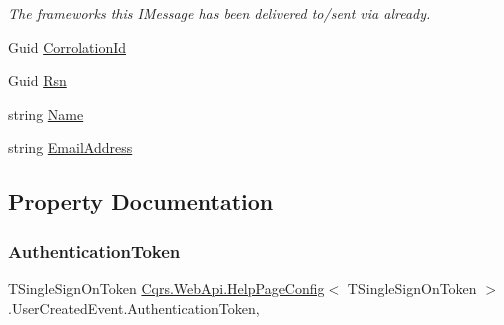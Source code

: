 \begin{DoxyCompactItemize}
\begin{DoxyCompactList}\small\item\em The frameworks this I\+Message has been delivered to/sent via already. \end{DoxyCompactList}\item 
Guid \hyperlink{classCqrs_1_1WebApi_1_1HelpPageConfig_1_1UserCreatedEvent_a180187e5f4bbecad7b713efa3df64287}{Corrolation\+Id}
\item 
Guid \hyperlink{classCqrs_1_1WebApi_1_1HelpPageConfig_1_1UserCreatedEvent_a5921e34dd4ceb0222c5d676d5ec280c4}{Rsn}
\item 
string \hyperlink{classCqrs_1_1WebApi_1_1HelpPageConfig_1_1UserCreatedEvent_a7f2d8b02965bf47c010f7f85ae70df7e}{Name}
\item 
string \hyperlink{classCqrs_1_1WebApi_1_1HelpPageConfig_1_1UserCreatedEvent_a178a10218a8cdcc980ee9d7588970a4a}{Email\+Address}
\end{DoxyCompactItemize}


\subsection{Property Documentation}
\mbox{\label{classCqrs_1_1WebApi_1_1HelpPageConfig_1_1UserCreatedEvent_aa8d10ff30ee35f23533da85c0dac8d88}} 
\subsubsection{\texorpdfstring{Authentication\+Token}{AuthenticationToken}}
{\footnotesize\ttfamily T\+Single\+Sign\+On\+Token \hyperlink{classCqrs_1_1WebApi_1_1HelpPageConfig}{Cqrs.\+Web\+Api.\+Help\+Page\+Config}$<$ T\+Single\+Sign\+On\+Token $>$.User\+Created\+Event.\+Authentication\+Token\hspace{0.3cm}{\ttfamily [get]}, {\ttfamily [set]}}

